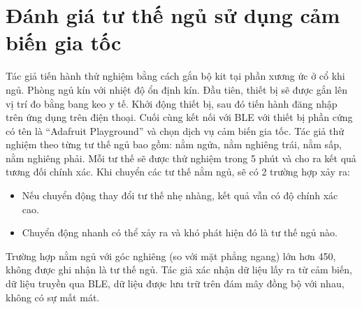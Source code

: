 \section{Đánh giá tư thế ngủ sử dụng cảm biến gia tốc}
Tác giả tiến hành thử nghiệm bằng cách gắn bộ kit tại phần xương ức ở cổ khi ngủ. Phòng ngủ kín với nhiệt độ ổn định kín.  Đầu tiên, thiết bị sẽ được gắn lên vị trí đo bằng bang keo y tế. Khởi động thiết bị, sau đó tiến hành đăng nhập trên ứng dụng trên điện thoại. Cuối cùng kết nối với BLE với thiết bị phần cứng có tên là “Adafruit Playground” và chọn dịch vụ cảm biến gia tốc. Tác giả thử nghiệm theo từng tư thế ngủ bao gồm: nằm ngửa, nằm nghiêng trái, nằm sấp, nằm nghiêng phải. Mỗi tư thế sẽ được thử nghiệm trong 5 phút và cho ra kết quả tương đối chính xác. Khi chuyển các tư thế nằm ngủ, sẽ có 2 trường hợp xảy ra: 

\begin{itemize}
    \item Nếu chuyển động thay đổi tư thế nhẹ nhàng, kết quả vẫn có độ chính xác cao.
    
    \item Chuyển động nhanh có thể xảy ra và khó phát hiện đó là tư thế ngủ nào.
\end{itemize}

Trường hợp nằm ngủ với góc nghiêng (so với mặt phẳng ngang) lớn hơn 450, không được ghi nhận là tư thế ngủ. Tác giả xác nhận dữ liệu lấy ra từ cảm biến, dữ liệu truyền qua BLE, dữ liệu được lưu trữ trên đám mây đồng bộ với nhau, không có sự mất mát.

